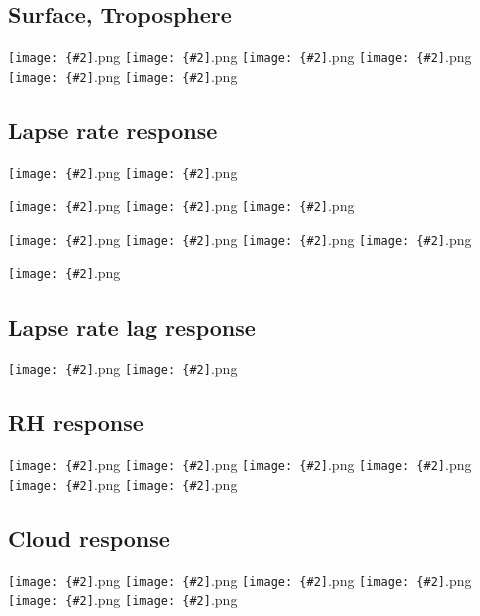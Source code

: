 \documentclass[12pt,a4paper]{article}
\newcommand{\pngfig}[2][0.5]{\texttt{[image: \{\#2]}.png}}
\begin{document}
\section{}

\subsection{Surface, Troposphere}
\pngfig[0.5]{comp_Tmax_sfc}
\pngfig[0.5]{comp_Tmin_sfc}
\pngfig[0.5]{comp_Tmax_700}
\pngfig[0.5]{comp_Tmin_700}
\pngfig[0.5]{comp_Tmax_300}
\pngfig[0.5]{comp_Tmin_300}

\subsection{Lapse rate response}
\pngfig[0.5]{regprof_TO_Zon_NH}
\pngfig[0.5]{comp_trop_zonal_profiles_m06}

\pngfig[0.5]{zonal_prof_land}
\pngfig[0.5]{zonal_prof_ocean}
\pngfig[0.5]{zonal_prof}

\pngfig[0.5]{theta_zonal_prof_land}
\pngfig[0.5]{theta_zonal_prof_ocean}
\pngfig[0.5]{theta_zonal_prof}
\pngfig[0.5]{theta_zonal_prof_zoom}


\pngfig[0.5]{cont_maxtemp_profile}

\subsection{Lapse rate lag response}

\pngfig[0.5]{3d_lag_lat15_30_v1}
\pngfig[0.5]{3d_lag_lat15_30_v2}

\pagebreak

\subsection{RH response}
\pngfig[0.5]{comp_RHmax_1000}
\pngfig[0.5]{comp_RHmin_1000}
\pngfig[0.5]{comp_RHmax_700}
\pngfig[0.5]{comp_RHmin_700}
\pngfig[0.5]{comp_RHmax_300}
\pngfig[0.5]{comp_RHmin_300}

\subsection{Cloud response}
\pngfig[0.5]{comp_cldfull_max}
\pngfig[0.5]{comp_cldfull_min}
\pngfig[0.5]{comp_cldhigh_max}
\pngfig[0.5]{comp_cldhigh_min}
\pngfig[0.5]{comp_cldlow_max}
\pngfig[0.5]{comp_cldlow_min}
\end{document}
